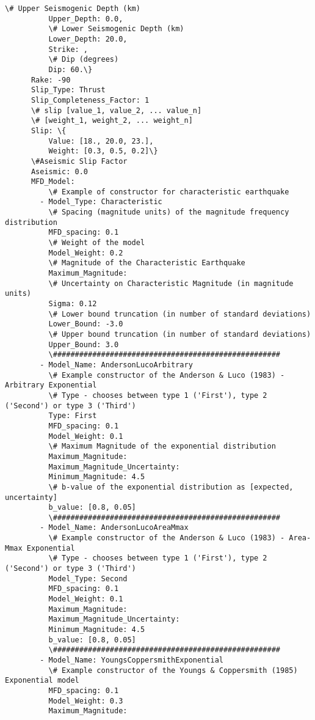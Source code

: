 \begin{Verbatim}[frame=single, commandchars=\\\{\}, fontsize=\scriptsize]
          \# Upper Seismogenic Depth (km)
          Upper_Depth: 0.0,
          \# Lower Seismogenic Depth (km)
          Lower_Depth: 20.0,
          Strike: ,
          \# Dip (degrees)
          Dip: 60.\}
      Rake: -90
      Slip_Type: Thrust
      Slip_Completeness_Factor: 1
      \# slip [value_1, value_2, ... value_n]
      \# [weight_1, weight_2, ... weight_n]
      Slip: \{
          Value: [18., 20.0, 23.],
          Weight: [0.3, 0.5, 0.2]\}
      \#Aseismic Slip Factor
      Aseismic: 0.0
      MFD_Model:
          \# Example of constructor for characteristic earthquake
        - Model_Type: Characteristic
          \# Spacing (magnitude units) of the magnitude frequency distribution
          MFD_spacing: 0.1
          \# Weight of the model
          Model_Weight: 0.2
          \# Magnitude of the Characteristic Earthquake
          Maximum_Magnitude:
          \# Uncertainty on Characteristic Magnitude (in magnitude units)
          Sigma: 0.12
          \# Lower bound truncation (in number of standard deviations)
          Lower_Bound: -3.0
          \# Upper bound truncation (in number of standard deviations)
          Upper_Bound: 3.0
          \####################################################
        - Model_Name: AndersonLucoArbitrary
          \# Example constructor of the Anderson & Luco (1983) - Arbitrary Exponential
          \# Type - chooses between type 1 ('First'), type 2 ('Second') or type 3 ('Third')
          Type: First
          MFD_spacing: 0.1
          Model_Weight: 0.1
          \# Maximum Magnitude of the exponential distribution
          Maximum_Magnitude:
          Maximum_Magnitude_Uncertainty:
          Minimum_Magnitude: 4.5
          \# b-value of the exponential distribution as [expected, uncertainty]
          b_value: [0.8, 0.05]
          \####################################################
        - Model_Name: AndersonLucoAreaMmax
          \# Example constructor of the Anderson & Luco (1983) - Area-Mmax Exponential
          \# Type - chooses between type 1 ('First'), type 2 ('Second') or type 3 ('Third')
          Model_Type: Second
          MFD_spacing: 0.1
          Model_Weight: 0.1
          Maximum_Magnitude:
          Maximum_Magnitude_Uncertainty:
          Minimum_Magnitude: 4.5
          b_value: [0.8, 0.05]
          \####################################################
        - Model_Name: YoungsCoppersmithExponential
          \# Example constructor of the Youngs & Coppersmith (1985) Exponential model
          MFD_spacing: 0.1
          Model_Weight: 0.3
          Maximum_Magnitude:

\end{Verbatim}
